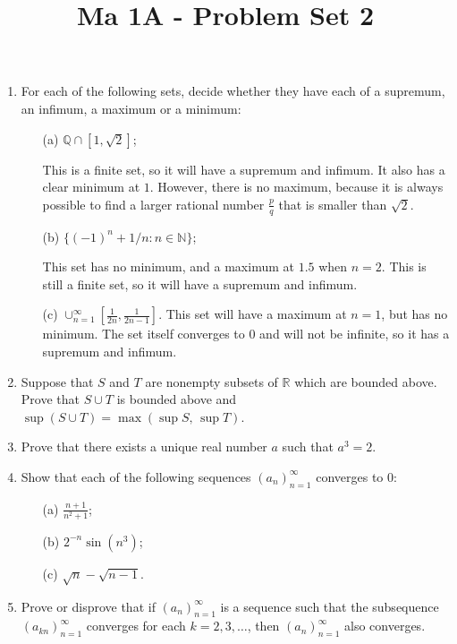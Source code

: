 \documentclass[11pt]{article}
\title{\vspace{-0.7cm}Ma 1A - Problem Set 2}
\date{}
\begin{document}
\maketitle

\begin{enumerate}

\item
For each of the following sets, decide whether they have each of a supremum, an infimum, a maximum or a minimum:
\begin{itemize}
\item[(a)] $\mathbb{Q} \cap [1, \sqrt{2}]$;

\bigskip
This is a finite set, so it will have a supremum and infimum. It also has a clear minimum at $1$. However, there is no maximum, because it is always possible to find a larger rational number $\frac{p}{q}$ that is smaller than $\sqrt{2}$. 

\item[(b)] $\{(-1)^n + 1/n : n \in \mathbb{N}\}$;

\bigskip
This set has no minimum, and a maximum at $1.5$ when $n=2$. This is still a finite set, so it will have a supremum and infimum. 

\item[(c)] $\cup_{n=1}^\infty [\frac{1}{2n}, \frac{1}{2n-1}]$.
This set will have a maximum at $n = 1$, but has no minimum. The set itself converges to $0$ and will not be infinite, so it has a supremum and infimum. 
\end{itemize}

\item
Suppose that $S$ and $T$ are nonempty subsets of $\mathbb{R}$ which are bounded above. Prove that $S \cup T$ is bounded above and $\sup (S\cup T) = \max(\sup S, \, \sup T)$.



\item
Prove that there exists a unique real number $a$ such that $a^3 = 2$.

\item
Show that each of the following sequences $(a_n)_{n=1}^\infty$ converges to $0$:
\begin{itemize}
\item[(a)] $\frac{n+1}{n^2 + 1}$;
\item[(b)] $2^{-n} \sin(n^3)$;
\item[(c)] $\sqrt{n} - \sqrt{n-1}$.
\end{itemize}


\item
Prove or disprove that if $(a_n)_{n=1}^\infty$ is a sequence such that the subsequence $(a_{kn})_{n=1}^\infty$ converges for each $k = 2, 3, \dots$, then $(a_n)_{n=1}^\infty$ also converges.

\end{enumerate}
\end{document}
